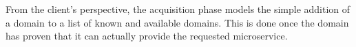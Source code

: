 
From the client's perspective, the acquisition phase models the simple addition of a domain to a list of known and available domains. This is done once the domain has proven that it can actually provide the requested microservice. 








